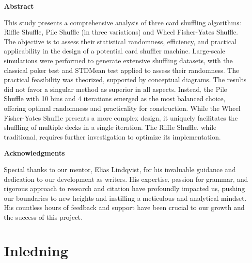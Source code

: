 \documentclass[swedish,a4paper]{article}
\begin{document}


\begin{center}
    \large
    \textbf{Abstract}
\end{center}
\vspace{0.5cm} 
\begin{adjustwidth}{2cm}{2cm} 
This study presents a comprehensive analysis of three card shuffling algorithms:
Riffle Shuffle, Pile Shuffle (in three variations) and Wheel Fisher-Yates
Shuffle. The objective is to assess their statistical randomness, efficiency,
and practical applicability in the design of a potential card shuffler machine.
Large-scale simulations were performed to generate extensive shuffling datasets,
with the classical poker test and STDMean test applied to assess their
randomness. The practical feasibility was theorized, supported by conceptual
diagrams. The results did not favor a singular method as superior in all
aspects. Instead, the Pile Shuffle with 10 bins and 4 iterations emerged as the
most balanced choice, offering optimal randomness and practicality for
construction. While the Wheel Fisher-Yates Shuffle presents a more complex
design, it uniquely facilitates the shuffling of multiple decks in a single
iteration. The Riffle Shuffle, while traditional, requires further investigation
to optimize its implementation.
\vspace{1cm} 
\begin{center}
    \large
    \textbf{Acknowledgments}
\end{center}
\vspace{0.5cm} 
Special thanks to our mentor, Elias Lindqvist, for his invaluable guidance and
dedication to our development as writers. His expertise, passion for grammar,
and rigorous approach to research and citation have profoundly impacted us,
pushing our boundaries to new heights and instilling a meticulous and analytical
mindset. His countless hours of feedback and support have been crucial to our
growth and the success of this project.
\newpage

\end{adjustwidth}


\tableofcontents
\newpage

\glsaddall[] %
\printglossary[title=Ordlista] %
\newpage

\section{Inledning}
\end{document}
